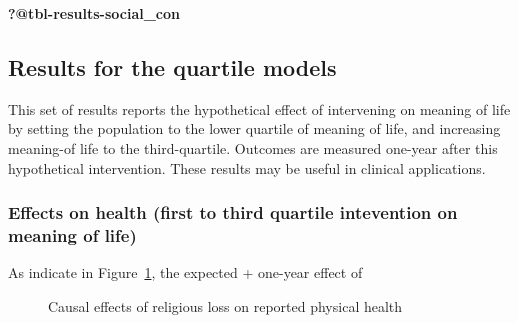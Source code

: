 \documentclass[
  singlecolumn,
  9pt]{scrartcl}
\begin{document}
\textbf{?@tbl-results-social\_con}

\subsection{Results for the quartile
models}\label{results-for-the-quartile-models}

This set of results reports the hypothetical effect of intervening on
meaning of life by setting the population to the lower quartile of
meaning of life, and increasing meaning-of life to the third-quartile.
Outcomes are measured one-year after this hypothetical intervention.
These results may be useful in clinical applications.

\subsubsection{Effects on health (first to third quartile intevention on
meaning of
life)}\label{effects-on-health-first-to-third-quartile-intevention-on-meaning-of-life}

As indicate in Figure~\ref{fig-results-health}, the expected + one-year
effect of

\begin{figure}


\caption{\label{fig-results-health}Causal effects of religious loss on
reported physical health}

\end{figure}%
\end{document}
